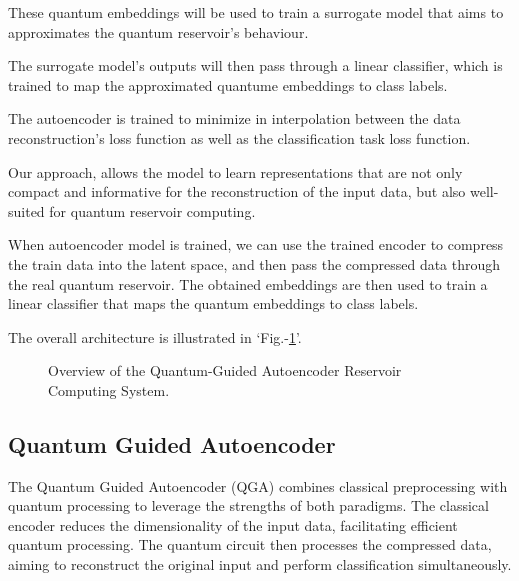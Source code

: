 \documentclass[conference]{IEEEtran}
\begin{document}
These quantum embeddings will be used to train a
surrogate model that aims to 
approximates the quantum reservoir's behaviour.

The surrogate model's outputs will then pass 
through a linear classifier, which is trained
to map the approximated quantume embeddings to class labels.

The autoencoder is trained to minimize in interpolation
between the data reconstruction's loss function as well 
as the classification task loss function.

Our approach, allows the model to learn representations that are not only
compact and informative for the reconstruction of the input data,
but also well-suited for quantum reservoir computing.

When autoencoder model is trained,
we can use the trained encoder to compress the train
data into the latent space, and then pass the 
compressed data through the real quantum reservoir.
The obtained embeddings are then used to train a linear
classifier that maps the quantum embeddings to class labels.

The overall architecture is illustrated in `Fig.-\ref{fig:qgars_pipeline}'.


\begin{figure}[!b]
    \centering
    \label{fig:qgars_pipeline}
    \caption{Overview of the Quantum-Guided Autoencoder Reservoir Computing System.}
\end{figure}

\subsection{Quantum Guided Autoencoder}
The Quantum Guided Autoencoder (QGA) combines classical 
preprocessing with quantum processing to leverage 
the strengths of both paradigms. The classical encoder 
reduces the dimensionality of the input data, facilitating 
efficient quantum processing. The quantum circuit 
then processes the compressed data, aiming to reconstruct 
the original input and perform classification simultaneously.
\end{document}
